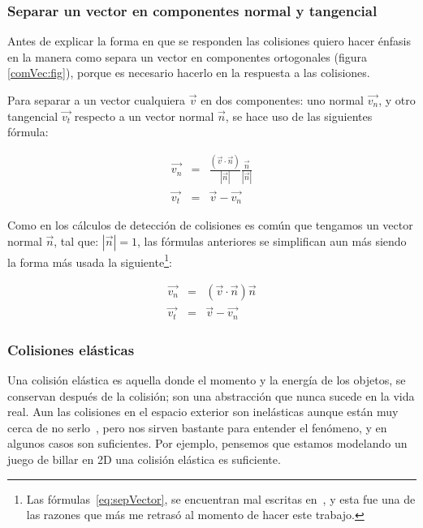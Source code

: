 \subsubsection{Separar un vector en componentes normal y tangencial}
Antes de explicar la forma en que se responden las colisiones quiero hacer énfasis en la manera como separa un vector en componentes ortogonales (figura \ref{comVec:fig}), porque es necesario hacerlo en la respuesta a las colisiones.

Para separar a un vector cualquiera $\vec{v}$ en dos componentes: uno normal $\vec{v_n}$, y otro tangencial $\vec{v_t}$ respecto a un vector normal $\vec{n}$, se hace uso de las siguientes fórmula:

\begin{eqnarray}
\vec{v_n} & = &\frac{(\vec{v} \cdot \vec{n})}{|\vec{n}|} \frac{\vec{n}}{|\vec{n}|} \nonumber \\
\vec{v_t} & = & \vec{v} - \vec{v_n} \nonumber
\end{eqnarray}

Como en los cálculos de detección de colisiones es común que tengamos un vector normal $\vec{n}$, tal que: $|\vec{n}| = 1$, las fórmulas anteriores se simplifican aun más siendo la forma más usada la siguiente\footnote{Las fórmulas~\ref{eq:sepVector}, se encuentran mal escritas en~\cite{BaraffWitkin:Coursenotes}, y esta fue una de las razones que más me retrasó al momento de hacer este trabajo.}:

\begin{eqnarray}
\vec{v_n} & = &(\vec{v} \cdot \vec{n}) \vec{n} \nonumber \\
\vec{v_t} & = & \vec{v} - \vec{v_n}
\label{eq:sepVector} 
\end{eqnarray}

\subsubsection{Colisiones elásticas}

Una colisión elástica es aquella donde el momento y la energía de los objetos, se conservan después de la colisión; son una abstracción que nunca sucede en la vida real. Aun las colisiones en el espacio exterior son inelásticas aunque están muy cerca de no serlo~\cite{FisicaMatematicasVideojuegos}, pero nos sirven bastante para entender el fenómeno, y en algunos casos son suficientes. Por ejemplo, pensemos que estamos modelando un juego de billar en 2D una colisión elástica es suficiente.

